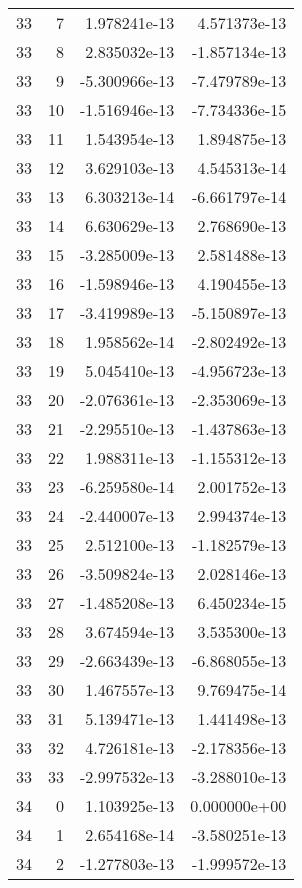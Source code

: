 \begin{tabular}{rrrr}
  33 &    7 &  1.978241e-13 &  4.571373e-13 \\
  33 &    8 &  2.835032e-13 & -1.857134e-13 \\
  33 &    9 & -5.300966e-13 & -7.479789e-13 \\
  33 &   10 & -1.516946e-13 & -7.734336e-15 \\
  33 &   11 &  1.543954e-13 &  1.894875e-13 \\
  33 &   12 &  3.629103e-13 &  4.545313e-14 \\
  33 &   13 &  6.303213e-14 & -6.661797e-14 \\
  33 &   14 &  6.630629e-13 &  2.768690e-13 \\
  33 &   15 & -3.285009e-13 &  2.581488e-13 \\
  33 &   16 & -1.598946e-13 &  4.190455e-13 \\
  33 &   17 & -3.419989e-13 & -5.150897e-13 \\
  33 &   18 &  1.958562e-14 & -2.802492e-13 \\
  33 &   19 &  5.045410e-13 & -4.956723e-13 \\
  33 &   20 & -2.076361e-13 & -2.353069e-13 \\
  33 &   21 & -2.295510e-13 & -1.437863e-13 \\
  33 &   22 &  1.988311e-13 & -1.155312e-13 \\
  33 &   23 & -6.259580e-14 &  2.001752e-13 \\
  33 &   24 & -2.440007e-13 &  2.994374e-13 \\
  33 &   25 &  2.512100e-13 & -1.182579e-13 \\
  33 &   26 & -3.509824e-13 &  2.028146e-13 \\
  33 &   27 & -1.485208e-13 &  6.450234e-15 \\
  33 &   28 &  3.674594e-13 &  3.535300e-13 \\
  33 &   29 & -2.663439e-13 & -6.868055e-13 \\
  33 &   30 &  1.467557e-13 &  9.769475e-14 \\
  33 &   31 &  5.139471e-13 &  1.441498e-13 \\
  33 &   32 &  4.726181e-13 & -2.178356e-13 \\
  33 &   33 & -2.997532e-13 & -3.288010e-13 \\
  34 &    0 &  1.103925e-13 &  0.000000e+00 \\
  34 &    1 &  2.654168e-14 & -3.580251e-13 \\
  34 &    2 & -1.277803e-13 & -1.999572e-13 \\

\end{tabular}
